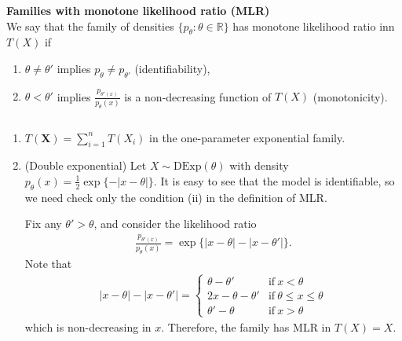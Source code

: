 \begin{definition}
    \textbf{Families with monotone likelihood ratio (MLR)}\\
    We say that the family of densities $\{p_\theta:\theta\in\mathbb{R}\}$ has monotone likelihood ratio inn $T(X)$ if
    \begin{enumerate}[{(1)}]
        \item $\theta\neq\theta'$ implies $p_{\theta}\neq p_{\theta'}$ (identifiability),
        \item $\theta<\theta'$ implies $\frac{p_{\theta'(x)}}{p_{\theta}(x)}$ is a non-decreasing function of $T(X)$ (monotonicity).
    \end{enumerate}
\end{definition}

\begin{example}
    $~$\\
    \begin{enumerate}[{1)}]
        \item $T(\boldsymbol{X})=\sum_{i=1}^n T(X_i)$ in the one-parameter exponential family.
        \item (Double exponential) Let $X\sim\text{DExp}(\theta)$ with density
        $p_\theta(x)=\frac{1}{2}\exp\{-|x-\theta|\}$.
        It is easy to see that the model is identifiable,
        so we need check only the condition (ii) in the definition of MLR.

        Fix any $\theta'>\theta$, and consider the likelihood ratio
        \begin{gather}
            \frac{p_{\theta'(x)}}{p_\theta(x)}
            =\exp\{|x-\theta|-|x-\theta'|\}.
        \end{gather}
        Note that 
        \begin{gather}
            |x-\theta|-|x-\theta'|=\left\{\begin{array}{cc}
                \theta-\theta'      & \text{if}~x<\theta \\
                2x-\theta-\theta'   & \text{if}~\theta\leq{x}\leq\theta \\
                \theta'-\theta      & \text{if}~x>\theta
            \end{array}\right.
        \end{gather}
        which is non-decreasing in $x$.
        Therefore, the family has MLR in $T(X)=X$.
    \end{enumerate}
\end{example}


